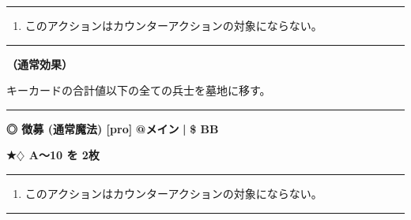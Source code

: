 \documentclass[twocolumn,a5paper,papersize,10pt]{jarticle}
\begin{document}
\vspace{1mm}%
\hrule height 0.1mm depth 0mm width 66.5mm %
\vspace{1mm}%


\vspace{-1zh}%
\begin{enumerate}
\renewcommand{\labelenumi}{※}
\setlength{\leftskip}{-0.3cm}
\setlength{\itemsep}{0pt} %
\setlength{\parskip}{0pt} %

\item このアクションはカウンターアクションの対象にならない。

\vspace{-3mm}%
\end{enumerate}
\vspace{1mm}%
\hrule height 0.1mm depth 0mm width 66.5mm %
\vspace{1mm}%

{\bf（通常効果）}

キーカードの合計値以下の全ての兵士を墓地に移す。
\vspace{2mm} %
\hrule height 0.5mm depth 0mm width 66.5mm %
\vspace{1mm} %
{\small\bf ◎ 徴募 {\scriptsize (通常魔法) [pro]}} %
\hfill 
{\footnotesize\bf @メイン }
  {\footnotesize\bf | } {\footnotesize\bf \$ BB}

{\footnotesize\bf ★{\normalsize $\diamondsuit$} A〜10 を 2枚}

\vspace{1mm}%
\hrule height 0.1mm depth 0mm width 66.5mm %
\vspace{1mm}%


\vspace{-1zh}%
\begin{enumerate}
\renewcommand{\labelenumi}{※}
\setlength{\leftskip}{-0.3cm}
\setlength{\itemsep}{0pt} %
\setlength{\parskip}{0pt} %

\item このアクションはカウンターアクションの対象にならない。

\vspace{-3mm}%
\end{enumerate}
\vspace{1mm}%
\hrule height 0.1mm depth 0mm width 66.5mm %
\vspace{1mm}%
\end{document}

